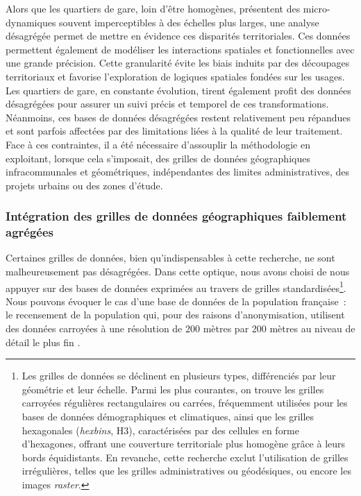 \begin{refsegment}
Alors que les quartiers de gare, loin d’être homogènes, présentent des micro-dynamiques souvent imperceptibles à des échelles plus larges, une analyse désagrégée permet de mettre en évidence ces disparités territoriales. Ces données permettent également de modéliser les interactions spatiales et fonctionnelles avec une grande précision. Cette granularité évite les biais induits par des découpages territoriaux et favorise l’exploration de logiques spatiales fondées sur les usages. Les quartiers de gare, en constante évolution, tirent également profit des données désagrégées pour assurer un suivi précis et temporel de ces transformations. Néanmoins, ces bases de données désagrégées restent relativement peu répandues et sont parfois affectées par des limitations liées à la qualité de leur traitement. Face à ces contraintes, il a été nécessaire d’assouplir la méthodologie en exploitant, lorsque cela s’imposait, des grilles de données géographiques infracommunales et géométriques, indépendantes des limites administratives, des projets urbains ou des zones d’étude.%

\subsubsection*{Intégration des grilles de données géographiques faiblement agrégées
    \label{chap3:quartiers-gare-calcul-carreaux}
    }

Certaines grilles de données, bien qu’indispensables à cette recherche, ne sont malheureusement pas désagrégées. Dans cette optique, nous avons choisi de nous appuyer sur des bases de données exprimées au travers de grilles standardisées\footnote{
    Les grilles de données se déclinent en plusieurs types, différenciés par leur géométrie et leur échelle. Parmi les plus courantes, on trouve les grilles carroyées régulières rectangulaires ou carrées, fréquemment utilisées pour les bases de données démographiques et climatiques, ainsi que les grilles hexagonales (\textsl{hexbins}, H3), caractérisées par des cellules en forme d’hexagones, offrant une couverture territoriale plus homogène grâce à leurs bords équidistants. En revanche, cette recherche exclut l’utilisation de grilles irrégulières, telles que les grilles administratives ou géodésiques, ou encore les images \textsl{raster}.
}. Nous pouvons évoquer le cas d'une base de données de la population française~: le recensement de la population qui, pour des raisons d’anonymisation, utilisent des données carroyées à une résolution de 200 mètres par 200 mètres au niveau de détail le plus fin \textcolor{blue}{\autocite{insee_grille_2021}}.%


\end{refsegment}
